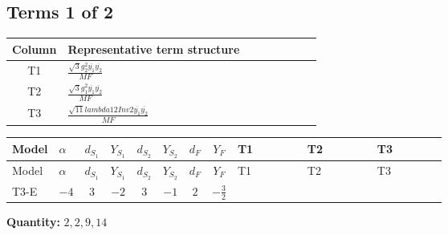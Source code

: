 \documentclass[8pt]{article}
\begin{document}
\begin{landscape}
\subsection*{Terms 1 of 2}
\begin{center}
\begin{tabular}{@{}c >{\raggedright\arraybackslash}p{0.82\linewidth}@{}}
\toprule
Column & Representative term structure \\
\midrule
T1 & \(\displaystyle \frac{\sqrt{3} g_{2}^{2} \overline{y_{1}} \overline{y_{2}}}{MF}\) \\
\midrule
T2 & \(\displaystyle \frac{\sqrt{3} g_{1}^{2} \overline{y_{1}} \overline{y_{2}}}{MF}\) \\
\midrule
T3 & \(\displaystyle \frac{\sqrt{11} lambda12Inv2 \overline{y_{1}} \overline{y_{2}}}{MF}\) \\
\midrule
\bottomrule
\end{tabular}
\end{center}
\smallskip
\tiny
\begin{longtable}{@{}llcccccc >{\raggedright\arraybackslash}p{0.21\linewidth} >{\raggedright\arraybackslash}p{0.21\linewidth} >{\raggedright\arraybackslash}p{0.21\linewidth}@{}}
\toprule
Model & $\alpha$ & $d_{S_1}$ & $Y_{S_1}$ & $d_{S_2}$ & $Y_{S_2}$ & $d_F$ & $Y_F$ & T1 & T2 & T3 \\
\midrule
\endfirsthead
\toprule
Model & $\alpha$ & $d_{S_1}$ & $Y_{S_1}$ & $d_{S_2}$ & $Y_{S_2}$ & $d_F$ & $Y_F$ & T1 & T2 & T3 \\
\midrule
\endhead
T3-E & $-4$ & $3$ & $-2$ & $3$ & $-1$ & $2$ & $-\frac{3}{2}$ & \scriptsize\adjustbox{max width=\linewidth}{$\begin{gathered} - \frac{11 \sqrt{3} g_{2}^{2} \overline{y_{1}} \overline{y_{2}}}{8 MF}\end{gathered}$} & \scriptsize\adjustbox{max width=\linewidth}{$\begin{gathered} - \frac{9 \sqrt{3} g_{1}^{2} \overline{y_{1}} \overline{y_{2}}}{8 MF}\end{gathered}$} & \scriptsize\adjustbox{max width=\linewidth}{$\begin{gathered} - \frac{3 \sqrt{11} lambda12Inv2 \overline{y_{1}} \overline{y_{2}}}{22 MF}\end{gathered}$} \\
\midrule
\bottomrule
\end{longtable}
\clearpage
\noindent\textbf{Quantity: }$\mathrm{2,2,9,14}$\par\smallskip

\end{landscape}
\end{document}
